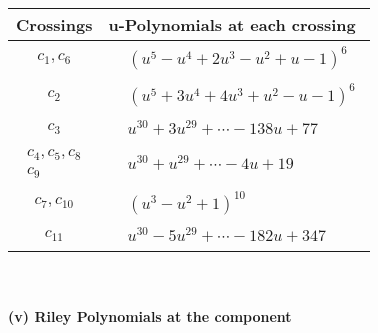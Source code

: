 \documentclass[1p]{elsarticle_modified}
\theoremstyle{definition}
\begin{document}
\begin{tabular}{m{50pt}|m{274pt}}
Crossings & \hspace{64pt}u-Polynomials at each crossing \\
\hline $$\begin{aligned}c_{1},c_{6}\end{aligned}$$&$\begin{aligned}
&(u^5- u^4+2 u^3- u^2+u-1)^6
\end{aligned}$\\
\hline $$\begin{aligned}c_{2}\end{aligned}$$&$\begin{aligned}
&(u^5+3 u^4+4 u^3+u^2- u-1)^6
\end{aligned}$\\
\hline $$\begin{aligned}c_{3}\end{aligned}$$&$\begin{aligned}
&u^{30}+3 u^{29}+\cdots-138 u+77
\end{aligned}$\\
\hline $$\begin{aligned}c_{4},c_{5},c_{8}\\c_{9}\end{aligned}$$&$\begin{aligned}
&u^{30}+u^{29}+\cdots-4 u+19
\end{aligned}$\\
\hline $$\begin{aligned}c_{7},c_{10}\end{aligned}$$&$\begin{aligned}
&(u^3- u^2+1)^{10}
\end{aligned}$\\
\hline $$\begin{aligned}c_{11}\end{aligned}$$&$\begin{aligned}
&u^{30}-5 u^{29}+\cdots-182 u+347
\end{aligned}$\\
\hline
\end{tabular}\\~\\
\newpage\renewcommand{\arraystretch}{1}
\flushleft \textbf{(v) Riley Polynomials at the component}\newline \\
\end{document}

